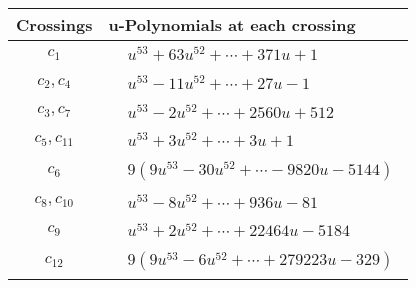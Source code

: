\documentclass[1p]{elsarticle_modified}
\theoremstyle{definition}
\begin{document}
\begin{tabular}{m{50pt}|m{274pt}}
Crossings & \hspace{64pt}u-Polynomials at each crossing \\
\hline $$\begin{aligned}c_{1}\end{aligned}$$&$\begin{aligned}
&u^{53}+63 u^{52}+\cdots+371 u+1
\end{aligned}$\\
\hline $$\begin{aligned}c_{2},c_{4}\end{aligned}$$&$\begin{aligned}
&u^{53}-11 u^{52}+\cdots+27 u-1
\end{aligned}$\\
\hline $$\begin{aligned}c_{3},c_{7}\end{aligned}$$&$\begin{aligned}
&u^{53}-2 u^{52}+\cdots+2560 u+512
\end{aligned}$\\
\hline $$\begin{aligned}c_{5},c_{11}\end{aligned}$$&$\begin{aligned}
&u^{53}+3 u^{52}+\cdots+3 u+1
\end{aligned}$\\
\hline $$\begin{aligned}c_{6}\end{aligned}$$&$\begin{aligned}
&9(9 u^{53}-30 u^{52}+\cdots-9820 u-5144)
\end{aligned}$\\
\hline $$\begin{aligned}c_{8},c_{10}\end{aligned}$$&$\begin{aligned}
&u^{53}-8 u^{52}+\cdots+936 u-81
\end{aligned}$\\
\hline $$\begin{aligned}c_{9}\end{aligned}$$&$\begin{aligned}
&u^{53}+2 u^{52}+\cdots+22464 u-5184
\end{aligned}$\\
\hline $$\begin{aligned}c_{12}\end{aligned}$$&$\begin{aligned}
&9(9 u^{53}-6 u^{52}+\cdots+279223 u-329)
\end{aligned}$\\
\hline
\end{tabular}\\~\\
\end{document}
